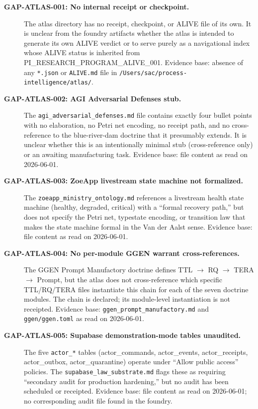 \begin{description}
  \item[\textbf{GAP-ATLAS-001: No internal receipt or checkpoint.}]
        The atlas directory has no receipt, checkpoint, or ALIVE file of its own.
        It is unclear from the foundry artifacts whether the atlas is intended to
        generate its own ALIVE verdict or to serve purely as a navigational index
        whose ALIVE status is inherited from PI\_RESEARCH\_PROGRAM\_ALIVE\_001.
        Evidence base: absence of any \texttt{*.json} or \texttt{ALIVE.md} file
        in \texttt{/Users/sac/process-intelligence/atlas/}.

  \item[\textbf{GAP-ATLAS-002: AGI Adversarial Defenses stub.}]
        The \texttt{agi\_adversarial\_defenses.md} file contains exactly four
        bullet points with no elaboration, no Petri net encoding, no receipt
        path, and no cross-reference to the blue-river-dam doctrine that it
        presumably extends. It is unclear whether this is an intentionally
        minimal stub (cross-reference only) or an awaiting manufacturing task.
        Evidence base: file content as read on 2026-06-01.

  \item[\textbf{GAP-ATLAS-003: ZoeApp livestream state machine not formalized.}]
        The \texttt{zoeapp\_ministry\_ontology.md} references a livestream health
        state machine (healthy, degraded, critical) with a ``formal recovery
        path,'' but does not specify the Petri net, typestate encoding, or
        transition law that makes the state machine formal in the Van der Aalst
        sense. Evidence base: file content as read on 2026-06-01.

  \item[\textbf{GAP-ATLAS-004: No per-module GGEN warrant cross-references.}]
        The GGEN Prompt Manufactory doctrine defines TTL $\to$ RQ $\to$ TERA
        $\to$ Prompt, but the atlas does not cross-reference which specific
        TTL/RQ/TERA files instantiate this chain for each of the seven doctrine
        modules. The chain is declared; its module-level instantiation is not
        receipted. Evidence base: \texttt{ggen\_prompt\_manufactory.md} and
        \texttt{ggen/ggen.toml} as read on 2026-06-01.

  \item[\textbf{GAP-ATLAS-005: Supabase demonstration-mode tables unaudited.}]
        The five \texttt{actor\_*} tables (actor\_commands, actor\_events,
        actor\_receipts, actor\_outbox, actor\_quarantine) operate under ``Allow
        public access'' policies. The \texttt{supabase\_law\_substrate.md} flags
        these as requiring ``secondary audit for production hardening,'' but no
        audit has been scheduled or receipted. Evidence base: file content as
        read on 2026-06-01; no corresponding audit file found in the foundry.
\end{description}

